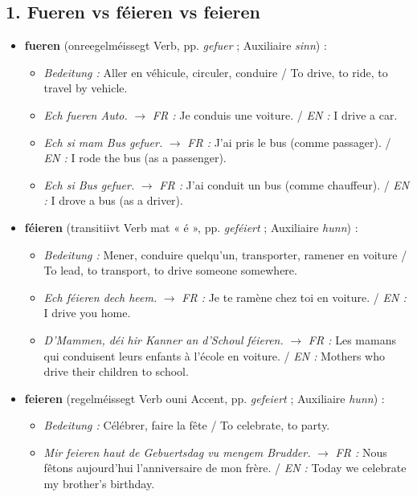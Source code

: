 \subsection*{1. Fueren vs féieren vs feieren}

\begin{itemize}
    \item \textbf{fueren} (onreegelméissegt Verb, pp. \textit{gefuer} ; Auxiliaire \textit{sinn}) :
    \begin{itemize}
        \item \textit{Bedeitung :} Aller en véhicule, circuler, conduire / To drive, to ride, to travel by vehicle.
        \item \textit{Ech fueren Auto.} $\rightarrow$ \textit{FR :} Je conduis une voiture. / \textit{EN :} I drive a car.
        \item \textit{Ech si mam Bus gefuer.} $\rightarrow$ \textit{FR :} J'ai pris le bus (comme passager). / \textit{EN :} I rode the bus (as a passenger).
        \item \textit{Ech si Bus gefuer.} $\rightarrow$ \textit{FR :} J'ai conduit un bus (comme chauffeur). / \textit{EN :} I drove a bus (as a driver).
    \end{itemize}

    \vspace{0.4em}

    \item \textbf{féieren} (transitiivt Verb mat « é », pp. \textit{geféiert} ; Auxiliaire \textit{hunn}) :
    \begin{itemize}
        \item \textit{Bedeitung :} Mener, conduire quelqu'un, transporter, ramener en voiture / To lead, to transport, to drive someone somewhere.
        \item \textit{Ech féieren dech heem.} $\rightarrow$ \textit{FR :} Je te ramène chez toi en voiture. / \textit{EN :} I drive you home.
        \item \textit{D'Mammen, déi hir Kanner an d'Schoul féieren.} $\rightarrow$ \textit{FR :} Les mamans qui conduisent leurs enfants à l'école en voiture. / \textit{EN :} Mothers who drive their children to school.
    \end{itemize}

    \vspace{0.4em}

    \item \textbf{feieren} (regelméissegt Verb ouni Accent, pp. \textit{gefeiert} ; Auxiliaire \textit{hunn}) :
    \begin{itemize}
        \item \textit{Bedeitung :} Célébrer, faire la fête / To celebrate, to party.
        \item \textit{Mir feieren haut de Gebuertsdag vu mengem Brudder.} $\rightarrow$ \textit{FR :} Nous fêtons aujourd'hui l'anniversaire de mon frère. / \textit{EN :} Today we celebrate my brother's birthday.
    \end{itemize}
\end{itemize}

